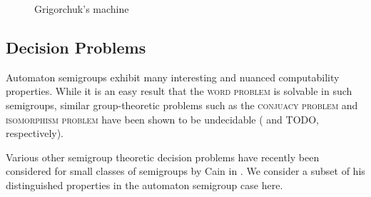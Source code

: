 \documentclass[10pt]{article} %
\newcommand{\decprob}[1]{\textsc{#1}}
\begin{document}
    \begin{figure}
    \begin{center}
    \caption{Grigorchuk's machine}
    \end{center}
    \end{figure}

    \subsection*{Decision Problems}
    Automaton semigroups exhibit many interesting and nuanced computability properties. While it is an easy result that the \decprob{word problem} is solvable in such semigroups, similar group-theoretic problems such as the \decprob{conjuacy problem} and \decprob{isomorphism problem} have been shown to be undecidable (\cite{sunic:conj} and TODO, respectively).

    Various other semigroup theoretic decision problems have recently been considered for small classes of semigroups by Cain in \cite{Cain09:dec_prob}. We consider a subset of his distinguished properties in the automaton semigroup case here.

\end{document}
